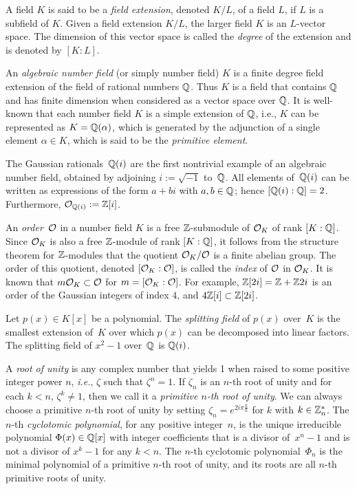 A field $K$ is said to be a \emph{field extension}, denoted $K/L$, of a field $L$, if $L$ is a subfield of $K$. Given a field extension $K/L$, the larger field $K$ is an $L$-vector space. The dimension of this vector space is called the \emph{degree} of the extension and is denoted by $[K : L]$.

An \emph{algebraic number field} (or simply number field) $K$ is a finite degree field extension of the field of rational numbers $\mathbb{Q}$.
Thus $K$ is a field that contains $\mathbb{Q}$ and has finite dimension when considered as a vector space over $\mathbb{Q}$. 
It is well-known that each number field $K$ is a simple extension of $\mathbb{Q}$, i.e., $K$ can be represented as $K = \mathbb{Q}(\alpha)$, which is generated by the adjunction of a single element $\alpha \in K$, which is said to be the \emph{primitive element}.
 
The Gaussian rationals~$\mathbb{Q}(i)$  are the first nontrivial example of an algebraic number field, obtained by adjoining $i:=\sqrt{-1}$ to~$\mathbb{Q}$.  All elements of~$\mathbb{Q}(i)$ can be written as expressions of the form $a+bi$ with $a,b\in \mathbb{Q}$; hence $[\mathbb{Q}(i) : \mathbb{Q}]=2$. 
Furthermore, $\mathcal{O}_{\mathbb{Q}(i)}:=\mathbb{Z}[i]$.

An \emph{order}~$\mathcal{O}$ in a number field $K$ is a free $\mathbb{Z}$-submodule of $\mathcal{O}_K$ of rank $[K:\mathbb{Q}]$. Since $\mathcal{O}_K$ is also a free $\mathbb{Z}$-module of rank $[K:\mathbb{Q}]$, it follows from the structure theorem for $\mathbb{Z}$-modules that the quotient $\mathcal{O}_K/\mathcal{O}$ is a finite abelian group. The order of this quotient, denoted $[\mathcal{O}_K : \mathcal{O}]$, is 
called the \emph{index} of $\mathcal{O}$ in $\mathcal{O}_K$.
It is known that $m\mathcal{O}_K\subset \mathcal{O}$ for $m=[\mathcal{O}_K : \mathcal{O}]$.
For example, $\mathbb{Z}[2i]=\mathbb{Z}+\mathbb{Z}2i$ is an order of the Gaussian integers of index $4$, and $4\mathbb{Z}[i] \subset \mathbb{Z}[2i]$.


Let $p(x) \in K[x]$ be a polynomial. The \emph{splitting field} of $p(x)$ over~$K$ is the smallest extension of~$K$ over which $p(x)$ can be decomposed into linear factors. The  splitting field of $x^2-1$ over~$\mathbb{Q}$ is $\mathbb{Q}(i)$.

A \emph{root of unity} is any complex number that yields 1 when raised to some positive integer power $n$, \emph{i.e.}, $\zeta$ such that $\zeta^n = 1$. If $\zeta_n$ is an $n$-th root of unity and for each $k < n$, $\zeta^k \neq 1$, then we call it a \emph{primitive $n$-th root of unity}. We can always choose a primitive $n$-th root of unity by setting $\zeta_n = e^{2i\pi\frac{k}{n}}$ for $k$ with $k\in \mathbb{Z}_n^*$.
The $n$-th \emph{cyclotomic polynomial}, for any positive integer~$n$, is the unique irreducible polynomial $\Phi(x) \in \mathbb{Q}[x]$ with integer coefficients that is a divisor of~$x^n - 1$ and is not a divisor of $x^k - 1$ for any $k < n$. The $n$-th cyclotomic polynomial~$\Phi_n$ is the minimal polynomial of a primitive $n$-th root of unity, and its roots are all $n$-th primitive roots of unity.
 
